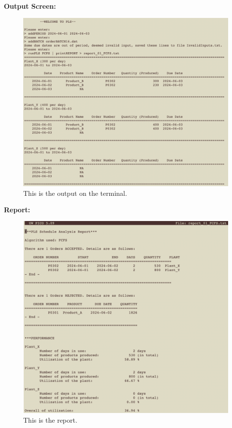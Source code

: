 \documentclass[conference]{IEEEtran}
\begin{document}
\textbf{Output Screen: }
\begin{figure}[htbp]
\centering
\includegraphics[width=0.9\columnwidth]{Figures/terminal.png}
\caption{This is the output on the terminal.}
\label{fig:terminal}
\end{figure}

\textbf{Report: }
\begin{figure}[htbp]
\centering
\includegraphics[width=0.9\columnwidth]{Figures/Report.png}
\caption{This is the report.}
\label{fig:Report}
\end{figure}
\end{document}
